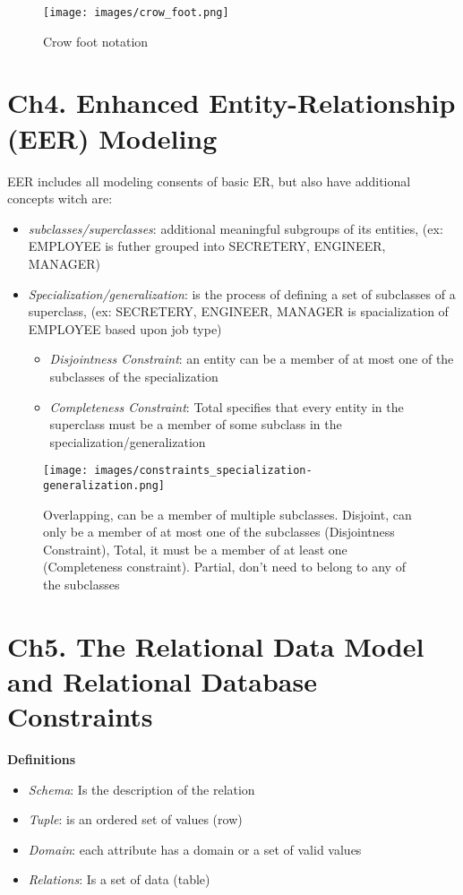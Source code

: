 \documentclass{article}
\begin{document}
\begin{figure}[!h]
    \centering
    \texttt{[image: images/crow\_foot.png]}
    \caption{Crow foot notation}
\end{figure}


\newpage
\section{Ch4. Enhanced Entity-Relationship (EER) Modeling}
EER includes all modeling consents of basic ER, but also have additional concepts witch are:
\begin{itemize}
    \item \textit{subclasses/superclasses}: additional meaningful subgroups of its entities, (ex: EMPLOYEE is futher grouped into SECRETERY, ENGINEER, MANAGER)
    \item \textit{Specialization/generalization}: is the process of defining a set of subclasses of a superclass, (ex: {SECRETERY, ENGINEER, MANAGER} is spacialization of EMPLOYEE based upon job type)
    \begin{itemize}
        \item \textit{Disjointness Constraint}: an entity can be a member of at most one of the subclasses of the specialization
        \item \textit{Completeness Constraint}: Total specifies that every entity in the superclass must be a member of some subclass in the specialization/generalization
    \end{itemize}
\end{itemize} 

\begin{figure}[!h]
    \centering
    \texttt{[image: images/constraints\_specialization-generalization.png]}
    \caption{Overlapping, can be a member of multiple subclasses. Disjoint, can only be a member of at most one of the subclasses (Disjointness Constraint),  Total, it must be a member of at least one (Completeness constraint). Partial, don't need to belong to any of the subclasses}
\end{figure}


\newpage
\section{Ch5. The Relational Data Model and Relational Database Constraints}
\noindent\textbf{Definitions}
\begin{itemize}
    \item \textit{Schema}: Is the description of the relation
    \item \textit{Tuple}: is an ordered set of values (row)
    \item \textit{Domain}: each attribute has a domain or a set of valid values
    \item \textit{Relations}: Is a set of data (table)
\end{itemize}
\end{document}
